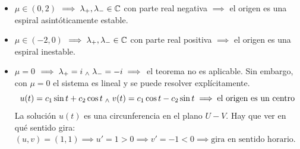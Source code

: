\begin{ejem}
\begin{itemize}
		\item $\mu \in (0,2)$ $\implies \lambda_+, \lambda_- \in \mathbb{C}$ con parte real negativa $\implies$ el origen es una espiral asintóticamente estable.
		\item $\mu \in (-2, 0)$ $\implies \lambda_+, \lambda_- \in \mathbb{C}$ con parte real positiva $\implies$ el origen es una espiral inestable.
		\item $\mu = 0$ $\implies \lambda_+ = i \; _{\wedge} \; \lambda_- = -i \implies$ el teorema no es aplicable. Sin embargo, con $\mu = 0$ el sistema es lineal y se puede resolver explícitamente.
		      \[u(t) = c_1 \sin{t} + c_2 \cos{t} \; _{\wedge} \; v(t) = c_1 \cos{t} - c_2 \sin{t} \implies \text{el origen es un centro}\]
		      La solución $u(t)$ es una circunferencia en el plano $U-V$. Hay que ver en qué sentido gira:
		      $(u,v) = (1,1) \implies u ' = 1 > 0 \implies v ' = -1 < 0 \implies \text{gira en sentido horario.}$
	\end{itemize}
\end{ejem}


